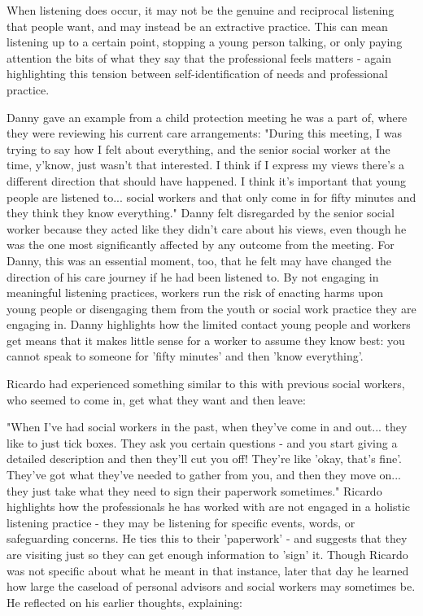 When listening does occur, it may not be the genuine and reciprocal listening that people want, and may instead be an extractive practice. This can mean listening up to a certain point, stopping a young person talking, or only paying attention the bits of what they say that the professional feels matters - again highlighting this tension between self-identification of needs and professional practice.

Danny gave an example from a child protection meeting he was a part of, where they were reviewing his current care arrangements:
"During this meeting, I was trying to say how I felt about everything, and the senior social worker at the time, y'know, just wasn't that interested. I think if I express my views there's a different direction that should have happened. I think it's important that young people are listened to... social workers and that only come in for fifty minutes and they think they know everything."
Danny felt disregarded by the senior social worker because they acted like they didn't care about his views, even though he was the one most significantly affected by any outcome from the meeting. For Danny, this was an essential moment, too, that he felt may have changed the direction of his care journey if he had been listened to. By not engaging in meaningful listening practices, workers run the risk of enacting harms upon young people or disengaging them from the youth or social work practice they are engaging in. Danny highlights how the limited contact young people and workers get means that it makes little sense for a worker to assume they know best: you cannot speak to someone for 'fifty minutes' and then 'know everything'.

Ricardo had experienced something similar to this with previous social workers, who seemed to come in, get what they want and then leave:

"When I've had social workers in the past, when they've come in and out... they like to just tick boxes. They ask you certain questions - and you start giving a detailed description and then they'll cut you off! They're like 'okay, that's fine'. They've got what they've needed to gather from you, and then they move on... they just take what they need to sign their paperwork sometimes."
Ricardo highlights how the professionals he has worked with are not engaged in a holistic listening practice - they may be listening for specific events, words, or safeguarding concerns. He ties this to their 'paperwork' - and suggests that they are visiting just so they can get enough information to 'sign' it. Though Ricardo was not specific about what he meant in that instance, later that day he learned how large the caseload of personal advisors and social workers may sometimes be. He reflected on his earlier thoughts, explaining:

